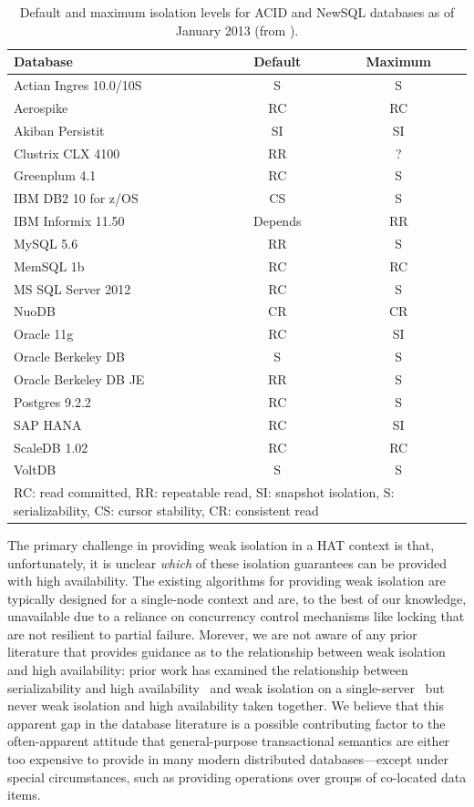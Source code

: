 \begin{table}
\begin{small}
\begin{tabular}{|l|c|c|}
\hline
Database & Default & Maximum\\\hline
Actian Ingres 10.0/10S & S & S\\
Aerospike & RC & RC\\
Akiban Persistit & SI & SI\\
Clustrix CLX 4100 & RR & ?\\
Greenplum 4.1 & RC & S \\
IBM DB2 10 for z/OS & CS & S\\
IBM Informix 11.50 & Depends & RR\\
MySQL 5.6 & RR & S \\
MemSQL 1b & RC & RC\\
MS SQL Server 2012 & RC & S \\
NuoDB & CR & CR\\
Oracle 11g & RC & SI\\
Oracle Berkeley DB & S & S\\
Oracle Berkeley DB JE & RR & S\\
Postgres 9.2.2 & RC & S\\
SAP HANA & RC & SI\\
ScaleDB 1.02 & RC & RC\\
VoltDB & S & S\\
\hline
\multicolumn{3}{|p{7cm}|}{{\footnotesize RC: read committed, RR: repeatable read, SI: snapshot isolation, S: serializability, CS: cursor stability, CR: consistent read}}\\\hline

\end{tabular}
\caption{Default and maximum isolation levels for ACID and NewSQL
  databases as of January 2013 (from
  \protect\cite{hat-hotos}).}\vspace{-1.5em}
\label{table:existing}
\end{small}
\end{table}

The primary challenge in providing weak isolation in a HAT context is
that, unfortunately, it is unclear \textit{which} of these isolation
guarantees can be provided with high availability. The existing
algorithms for providing weak isolation are typically designed for a
single-node context and are, to the best of our knowledge, unavailable
due to a reliance on concurrency control mechanisms like locking that
are not resilient to partial failure. Morever, we are not aware of any
prior literature that provides guidance as to the relationship between
weak isolation and high availability: prior work has examined the
relationship between serializability and high
availability~\cite{davidson-survey} and weak isolation on a
single-server~\cite{adya, ansicritique} but never weak isolation and
high availability taken together. We believe that this apparent gap in
the database literature is a possible contributing factor to the
often-apparent attitude that general-purpose transactional semantics
are either too expensive to provide in many modern distributed
databases---except under special circumstances, such as providing
operations over groups of co-located data items.
